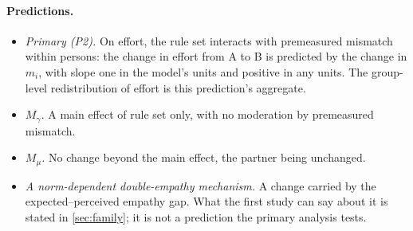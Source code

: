 \paragraph{Predictions.}
\begin{itemize}[leftmargin=*]
\item \emph{Primary (P2).} On effort, the rule set interacts with premeasured mismatch within persons: the change in effort from A to B is predicted by the change in $m_i$, with slope one in the model's units and positive in any units. The group-level redistribution of effort is this prediction's aggregate.
\item \emph{$M_\gamma$.} A main effect of rule set only, with no moderation by premeasured mismatch.
\item \emph{$M_\mu$.} No change beyond the main effect, the partner being unchanged.
\item \emph{A norm-dependent double-empathy mechanism.} A change carried by the expected--perceived empathy gap. What the first study can say about it is stated in \autoref{sec:family}; it is not a prediction the primary analysis tests.
\end{itemize}

